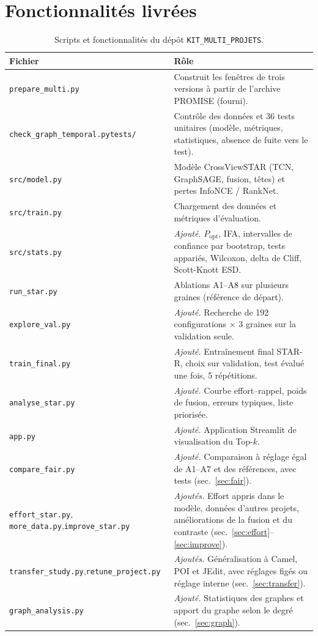\documentclass[11pt,a4paper,openany]{report}
\newcommand{\code}[1]{\texttt{\small #1}}
\begin{document}
\section{Fonctionnalités livrées}
\begin{table}[htbp]
\centering\small
\caption{Scripts et fonctionnalités du dépôt \code{KIT\_MULTI\_PROJETS}.}
\label{tab:scripts}
\begin{tabularx}{\linewidth}{>{\raggedright\arraybackslash}p{4.4cm}X}
\toprule
\textbf{Fichier} & \textbf{Rôle} \\
\midrule
\code{prepare\_multi.py} & Construit les fenêtres de trois versions à partir de l'archive PROMISE (fourni). \\
\code{check\_graph\_temporal.py}\newline\code{tests/} & Contrôle des données et 36 tests unitaires (modèle, métriques,
statistiques, absence de fuite vers le test). \\
\code{src/model.py} & Modèle CrossViewSTAR (TCN, GraphSAGE, fusion, têtes) et pertes InfoNCE / RankNet. \\
\code{src/train.py} & Chargement des données et métriques d'évaluation. \\
\code{src/stats.py} & \emph{Ajouté.} $P_{\mathrm{opt}}$, IFA, intervalles de confiance par bootstrap, tests appariés,
Wilcoxon, delta de Cliff, Scott-Knott ESD. \\
\code{run\_star.py} & Ablations A1--A8 sur plusieurs graines (référence de départ). \\
\code{explore\_val.py} & \emph{Ajouté.} Recherche de 192 configurations $\times$ 3 graines sur la validation seule. \\
\code{train\_final.py} & \emph{Ajouté.} Entraînement final STAR-R, choix sur validation, test évalué une fois, 5 répétitions. \\
\code{analyse\_star.py} & \emph{Ajouté.} Courbe effort--rappel, poids de fusion, erreurs typiques, liste priorisée. \\
\code{app.py} & \emph{Ajouté.} Application Streamlit de visualisation du Top-$k$. \\
\code{compare\_fair.py} & \emph{Ajouté.} Comparaison à réglage égal de A1--A7 et des références, avec tests (sec.~\ref{sec:fair}). \\
\code{effort\_star.py}, \code{more\_data.py},\newline\code{improve\_star.py} & \emph{Ajoutés.} Effort appris dans le
modèle, données d'autres projets, améliorations de la fusion et du contraste (sec.~\ref{sec:effort}--\ref{sec:improve}). \\
\code{transfer\_study.py},\newline\code{retune\_project.py} & \emph{Ajoutés.} Généralisation à Camel, POI et JEdit,
avec réglages figés ou réglage interne (sec.~\ref{sec:transfer}). \\
\code{graph\_analysis.py} & \emph{Ajouté.} Statistiques des graphes et apport du graphe selon le degré (sec.~\ref{sec:graph}). \\
\bottomrule
\end{tabularx}
\end{table}
\end{document}
